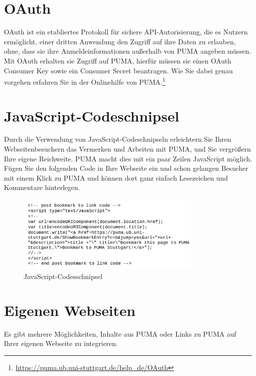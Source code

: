 \section{OAuth}
\label{sec:oAuth}
OAuth ist ein etabliertes Protokoll für sichere API-Autorisierung, die es Nutzern ermöglicht, einer dritten Anwendung den Zugriff auf ihre Daten zu erlauben, ohne, dass sie ihre Anmeldeinformationen außerhalb von PUMA angeben müssen. Mit OAuth erhalten sie Zugriff auf PUMA, hierfür müssen sie einen OAuth Consumer Key sowie ein Consumer Secret beantragen. Wie Sie dabei genau vorgehen erfahren Sie in der Onlinehilfe von PUMA.\footnote{\url{https://puma.ub.uni-stuttgart.de/help_de/OAuth}}



\section{JavaScript-Codeschnipsel}
\label{sec:javaScriptCode}
Durch die Verwendung von JavaScript-Codeschnipseln erleichtern Sie Ihren Webseitenbesuchern das Vermerken und Arbeiten mit PUMA, und Sie vergrößern Ihre eigene Reichweite. PUMA macht dies mit ein paar Zeilen JavaScript möglich. Fügen Sie den folgenden Code in Ihre Webseite ein und schon gelangen Besucher mit einem Klick zu PUMA und können dort ganz einfach Lesezeichen und Kommentare hinterlegen.
\begin{figure}[h!]
 \centering
 \includegraphics[width=9cm]{Bilder/Kapitel9/JavaScript_Codeschnipsel.PNG}
 \caption{JavaScript-Codesschnipsel}
 \label{fig:javascriptCode}
\end{figure}

\section{Eigenen Webseiten}
\label{sec:eigeneWebseiten}
Es gibt mehrere Möglichkeiten, Inhalte aus PUMA oder Links zu PUMA auf Ihrer eigenen Webseite zu integrieren.

